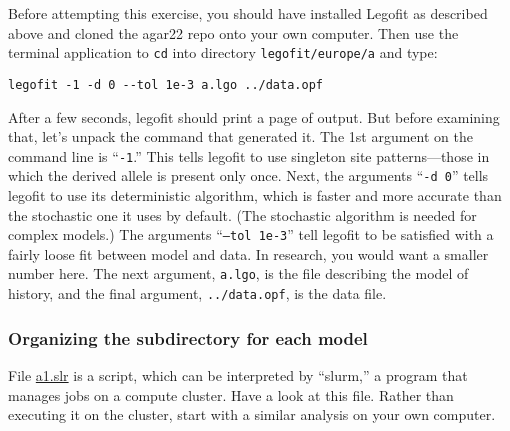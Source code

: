 \documentclass[11pt]{article}
\begin{document}
Before attempting this exercise, you should have installed Legofit as
described above and cloned the agar22 repo onto your own
computer. Then use the terminal application to \texttt{cd} into
directory \texttt{legofit/europe/a} and type:
\begin{verbatim}
legofit -1 -d 0 --tol 1e-3 a.lgo ../data.opf
\end{verbatim}
After a few seconds, legofit should print a page of output. But before
examining that, let's unpack the command that generated it. The 1st
argument on the command line is ``\texttt{-1}.'' This tells legofit to
use singleton site patterns---those in which the derived allele is
present only once. Next, the arguments ``\texttt{-d 0}'' tells legofit
to use its deterministic algorithm, which is faster and more accurate
than the stochastic one it uses by default. (The stochastic algorithm
is needed for complex models.) The arguments ``\texttt{--tol 1e-3}''
tell legofit to be satisfied with a fairly loose fit between model and
data. In research, you would want a smaller number here. The next
argument, \texttt{a.lgo}, is the file describing the model of history,
and the final argument, \texttt{../data.opf}, is the data file.

\subsubsection{Organizing the subdirectory for each model}
File
\href{https://github.com/alanrogers/agar22/tree/main/legofit/europe/a/a1.slr}{a1.slr}
is a script, which can be interpreted by ``slurm,'' a program that
manages jobs on a compute cluster. Have a look at this file. Rather
than executing it on the cluster, start with a similar analysis on
your own computer.


\printbibliography
\end{document}
